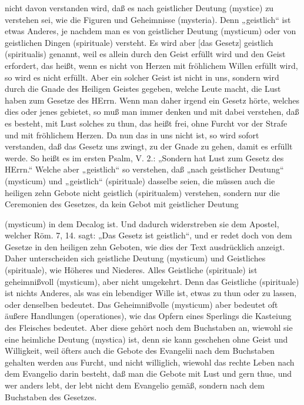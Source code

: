 nicht davon verstanden wird, daß es nach geistlicher Deutung (mystice) zu verstehen sei, wie die Figuren und Geheimnisse (mysteria). Denn „geistlich“ ist etwas Anderes, je nachdem man es von geistlicher Deutung (mysticum) oder von geistlichen Dingen (spirituale) versteht. Es wird aber [das Gesetz] geistlich (spiritualis) genannt, weil es allein durch den Geist erfüllt wird und den Geist erfordert, das heißt, wenn es nicht von Herzen mit fröhlichem Willen erfüllt wird, so wird es nicht erfüllt. Aber ein solcher Geist ist nicht in uns, sondern wird durch die Gnade des Heiligen Geistes gegeben, welche Leute macht, die Lust haben zum Gesetze des HErrn. Wenn man daher irgend ein Gesetz hörte, welches dies oder jenes gebietet, so muß man immer denken und mit dabei verstehen, daß es besteht, mit Lust solches zu thun, das heißt frei, ohne Furcht vor der Strafe und mit fröhlichem Herzen. Da nun das in uns nicht ist, so wird sofort verstanden, daß das Gesetz uns zwingt, zu der Gnade zu gehen, damit es erfüllt werde. So heißt es im ersten Psalm, V. 2.: „Sondern hat Lust zum Gesetz des HErrn.“ Welche aber „geistlich“ so verstehen, daß „nach geistlicher Deutung“ (mysticum) und „geistlich“ (spirituale) dasselbe seien, die müssen auch die heiligen zehn Gebote nicht geistlich (spiritualem) verstehen, sondern nur die Ceremonien des Gesetzes, da kein Gebot mit geistlicher Deutung

(mysticum) in dem Decalog ist. Und dadurch widerstreben sie dem Apostel, welcher Röm. 7, 14. sagt: „Das Gesetz ist geistlich“, und er redet doch von dem Gesetze in den heiligen zehn Geboten, wie dies der Text ausdrücklich anzeigt. Daher unterscheiden sich geistliche Deutung (mysticum) und Geistliches (spirituale), wie Höheres und Niederes. Alles Geistliche (spirituale) ist geheimnißvoll (mysticum), aber nicht umgekehrt. Denn das Geistliche (spirituale) ist nichts Anderes, als was ein lebendiger Wille ist, etwas zu thun oder zu lassen, oder denselben bedeutet. Das Geheimnißvolle (mysticum) aber bedeutet oft äußere Handlungen (operationes), wie das Opfern eines Sperlings die Kasteiung des Fleisches bedeutet. Aber diese gehört noch dem Buchstaben an, wiewohl sie eine heimliche Deutung (mystica) ist, denn sie kann geschehen ohne Geist und Willigkeit, weil öfters auch die Gebote des Evangelii nach dem Buchstaben gehalten werden aus Furcht, und nicht williglich, wiewohl das rechte Leben nach dem Evangelio darin besteht, daß man die Gebote mit Lust und gern thue, und wer anders lebt, der lebt nicht dem Evangelio gemäß, sondern nach dem Buchstaben des Gesetzes.

